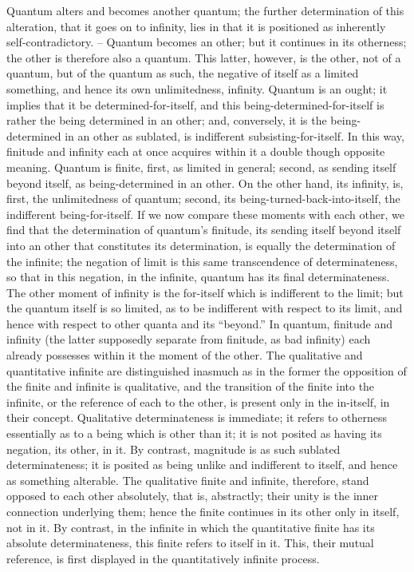 Quantum alters and becomes another quantum; the further determination
of this alteration, that it goes on to infinity, lies in that it is positioned as
inherently self-contradictory. – Quantum becomes an other; but it continues
in its otherness; the other is therefore also a quantum. This latter, however,
is the other, not of a quantum, but of the quantum as such, the negative
of itself as a limited something, and hence its own unlimitedness, infinity.
Quantum is an ought; it implies that it be determined-for-itself, and this
being-determined-for-itself is rather the being determined in an other; and,
conversely, it is the being-determined in an other as sublated, is indifferent
subsisting-for-itself.
In this way, finitude and infinity each at once acquires within it a double
though opposite meaning. Quantum is finite, first, as limited in general;
second, as sending itself beyond itself, as being-determined in an other. On
the other hand, its infinity, is, first, the unlimitedness of quantum; second,
its being-turned-back-into-itself, the indifferent being-for-itself. If we now
compare these moments with each other, we find that the determination
of quantum’s finitude, its sending itself beyond itself into an other that
constitutes its determination, is equally the determination of the infinite;
the negation of limit is this same transcendence of determinateness, so that
in this negation, in the infinite, quantum has its final determinateness.
The other moment of infinity is the for-itself which is indifferent to the
limit; but the quantum itself is so limited, as to be indifferent with respect
to its limit, and hence with respect to other quanta and its “beyond.”
In quantum, finitude and infinity (the latter supposedly separate from
finitude, as bad infinity) each already possesses within it the moment of
the other.
The qualitative and quantitative infinite are distinguished inasmuch as
in the former the opposition of the finite and infinite is qualitative, and the
transition of the finite into the infinite, or the reference of each to the other,
is present only in the in-itself, in their concept. Qualitative determinateness
is immediate; it refers to otherness essentially as to a being which is other
than it; it is not posited as having its negation, its other, in it. By contrast,
magnitude is as such sublated determinateness; it is posited as being unlike
and indifferent to itself, and hence as something alterable. The qualitative
finite and infinite, therefore, stand opposed to each other absolutely, that
is, abstractly; their unity is the inner connection underlying them; hence
the finite continues in its other only in itself, not in it. By contrast, in the
infinite in which the quantitative finite has its absolute determinateness,
this finite refers to itself in it. This, their mutual reference, is first displayed
in the quantitatively infinite process.

